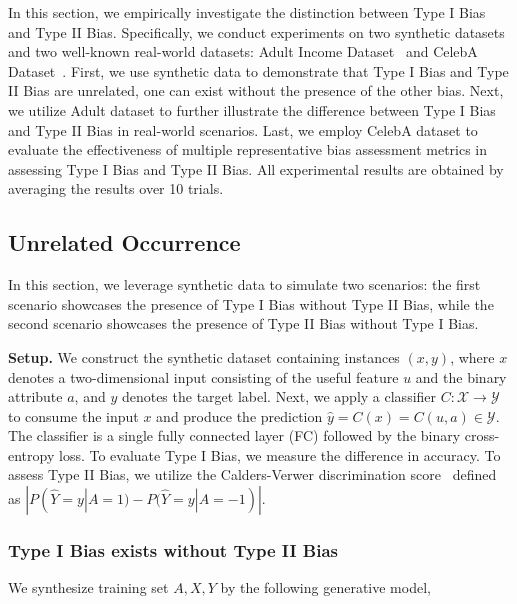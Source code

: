 \label{sec:distinction}





In this section, we empirically investigate the distinction between Type I Bias and Type II Bias.
Specifically, we conduct experiments on two synthetic datasets and two well-known real-world datasets: Adult Income Dataset~\cite{adult_dataset_and_german_dataset} and CelebA Dataset~\cite{CelebA}.
First, we use synthetic data to demonstrate that Type I Bias and Type II Bias are unrelated, \ie one can exist without the presence of the other bias.
Next, we utilize Adult dataset to further illustrate the difference between Type I Bias and Type II Bias in real-world scenarios.
Last, we employ CelebA dataset to evaluate the effectiveness of multiple representative bias assessment metrics in assessing Type I Bias and Type II Bias.
All experimental results are obtained by averaging the results over 10 trials.


\subsection{Unrelated Occurrence}
In this section, we leverage synthetic data to simulate two scenarios: the first scenario showcases the presence of Type I Bias without Type II Bias, while the second scenario showcases the presence of Type II Bias without Type I Bias.


\noindent
\textbf{Setup.}
We construct the synthetic dataset containing instances $(x, y)$, where $x$ denotes a two-dimensional input consisting of the useful feature $u$ and the binary attribute $a$, and $y$ denotes the target label.
Next, we apply a classifier $C: \mathcal{X} \rightarrow \mathcal{Y}$ to consume the input $x$ and produce the prediction $\hat{y} = C(x) = C(u,a) \in \mathcal{Y}$. 
The classifier is a single fully connected layer (FC) followed by the binary cross-entropy loss.
To evaluate Type I Bias, we measure the difference in accuracy. To assess Type II Bias, we utilize the Calders-Verwer discrimination score~\cite{discrimination_score} defined as $|P(\hat{Y}=y|A=1) - P(\hat{Y}=y|A=-1)|$.





\subsubsection{Type I Bias exists without Type II Bias}
We synthesize training set \wrt $A,X,Y$ by the following generative model,

